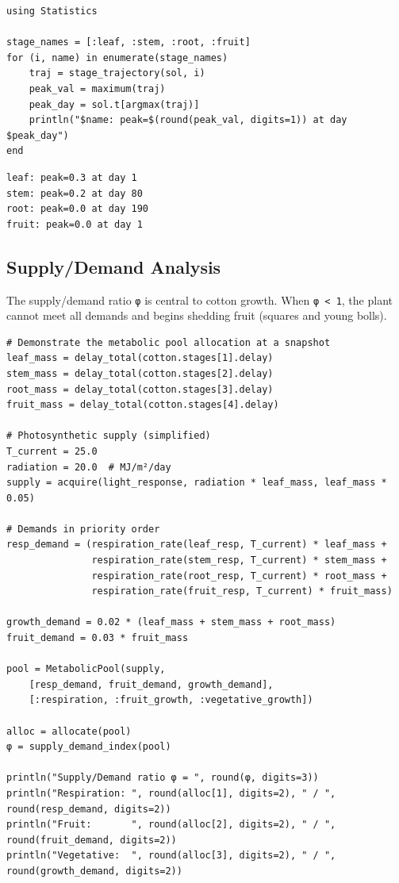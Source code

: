 \label{11745084665441657620}{}



\begin{verbatim}
using Statistics

stage_names = [:leaf, :stem, :root, :fruit]
for (i, name) in enumerate(stage_names)
    traj = stage_trajectory(sol, i)
    peak_val = maximum(traj)
    peak_day = sol.t[argmax(traj)]
    println("$name: peak=$(round(peak_val, digits=1)) at day $peak_day")
end
\end{verbatim}




\begin{verbatim}
leaf: peak=0.3 at day 1
stem: peak=0.2 at day 80
root: peak=0.0 at day 190
fruit: peak=0.0 at day 1
\end{verbatim}



\subsection{Supply/Demand Analysis}



\label{2687593630196150516}{}


The supply/demand ratio \texttt{φ} is central to cotton growth. When \texttt{φ < 1}, the plant cannot meet all demands and begins shedding fruit (squares and young bolls).




\begin{verbatim}
# Demonstrate the metabolic pool allocation at a snapshot
leaf_mass = delay_total(cotton.stages[1].delay)
stem_mass = delay_total(cotton.stages[2].delay)
root_mass = delay_total(cotton.stages[3].delay)
fruit_mass = delay_total(cotton.stages[4].delay)

# Photosynthetic supply (simplified)
T_current = 25.0
radiation = 20.0  # MJ/m²/day
supply = acquire(light_response, radiation * leaf_mass, leaf_mass * 0.05)

# Demands in priority order
resp_demand = (respiration_rate(leaf_resp, T_current) * leaf_mass +
               respiration_rate(stem_resp, T_current) * stem_mass +
               respiration_rate(root_resp, T_current) * root_mass +
               respiration_rate(fruit_resp, T_current) * fruit_mass)

growth_demand = 0.02 * (leaf_mass + stem_mass + root_mass)
fruit_demand = 0.03 * fruit_mass

pool = MetabolicPool(supply,
    [resp_demand, fruit_demand, growth_demand],
    [:respiration, :fruit_growth, :vegetative_growth])

alloc = allocate(pool)
φ = supply_demand_index(pool)

println("Supply/Demand ratio φ = ", round(φ, digits=3))
println("Respiration: ", round(alloc[1], digits=2), " / ", round(resp_demand, digits=2))
println("Fruit:       ", round(alloc[2], digits=2), " / ", round(fruit_demand, digits=2))
println("Vegetative:  ", round(alloc[3], digits=2), " / ", round(growth_demand, digits=2))
\end{verbatim}




